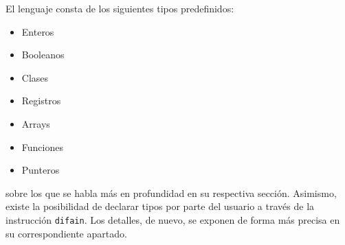 \documentclass[10pt,a4paper]{article}
\begin{document}
El lenguaje consta de los siguientes tipos predefinidos:
\begin{itemize}
    \item Enteros
    \item Booleanos
    \item Clases
    \item Registros
    \item Arrays
    \item Funciones
    \item Punteros
\end{itemize}
sobre los que se habla más en profundidad en su respectiva sección. Asimismo, existe la posibilidad de declarar tipos por parte del usuario a través de la instrucción \texttt{\color{blue}difain}. Los detalles, de nuevo, se exponen de forma más precisa en su correspondiente apartado.
\end{document}
